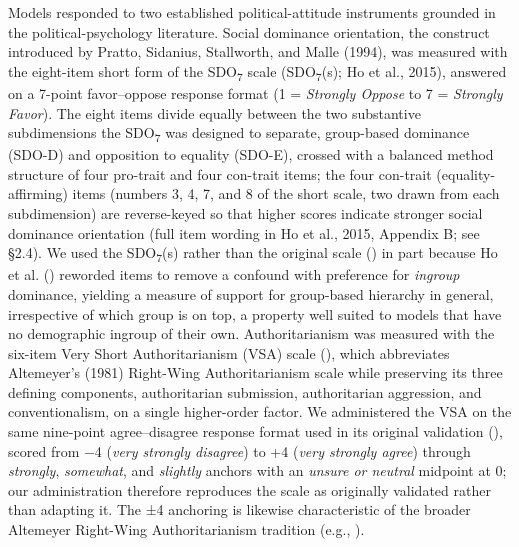 \documentclass[
]{article}
\begin{document}
Models responded to two established political-attitude instruments
grounded in the political-psychology literature. Social dominance
orientation, the construct introduced by Pratto, Sidanius, Stallworth,
and Malle (1994), was measured with the eight-item short form of the
SDO\textsubscript{7} scale (SDO\textsubscript{7}(s); Ho et al., 2015),
answered on a 7-point favor--oppose response format (1 = \emph{Strongly
Oppose} to 7 = \emph{Strongly Favor}). The eight items divide equally
between the two substantive subdimensions the SDO\textsubscript{7} was
designed to separate, group-based dominance (SDO-D) and opposition to
equality (SDO-E), crossed with a balanced method structure of four
pro-trait and four con-trait items; the four con-trait
(equality-affirming) items (numbers 3, 4, 7, and 8 of the short scale,
two drawn from each subdimension) are reverse-keyed so that higher
scores indicate stronger social dominance orientation (full item wording
in Ho et al., 2015, Appendix B; see §2.4). We used the
SDO\textsubscript{7}(s) rather than the original scale
() in part because Ho et
al. () reworded items to remove a confound
with preference for \emph{ingroup} dominance, yielding a measure of
support for group-based hierarchy in general, irrespective of which
group is on top, a property well suited to models that have no
demographic ingroup of their own. Authoritarianism was measured with the
six-item Very Short Authoritarianism (VSA) scale
(), which
abbreviates Altemeyer's (1981) Right-Wing Authoritarianism scale while
preserving its three defining components, authoritarian submission,
authoritarian aggression, and conventionalism, on a single higher-order
factor. We administered the VSA on the same nine-point agree--disagree
response format used in its original validation
(), scored from −4
(\emph{very strongly disagree}) to +4 (\emph{very strongly agree})
through \emph{strongly}, \emph{somewhat}, and \emph{slightly} anchors
with an \emph{unsure or neutral} midpoint at 0; our administration
therefore reproduces the scale as originally validated rather than
adapting it. The ±4 anchoring is likewise characteristic of the broader
Altemeyer Right-Wing Authoritarianism tradition (e.g.,
).
\end{document}
